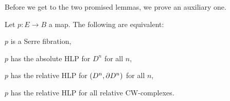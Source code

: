 

Before we get to the two promised lemmas, we prove an auxiliary one.

\begin{lemma}\label{lemma:equivalent-HCP}
Let $p:E\to B$ a map. The following are equivalent:
\begin{numerate}
\item $p$ is a Serre fibration,
\item $p$ has the absolute HLP for $D^n$ for all $n$,
\item $p$ has the relative HLP for $(D^n,\partial D^n)$ for all $n$,
\item $p$ has the relative HLP for all relative CW-complexes.
\end{numerate}
\end{lemma}

